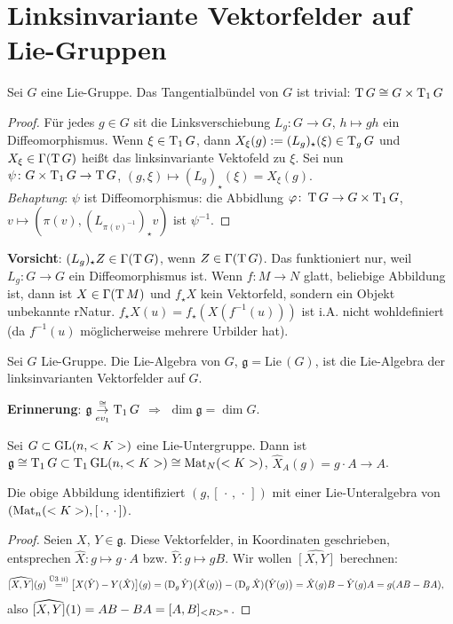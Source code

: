 \section{Linksinvariante Vektorfelder auf Lie-Gruppen}
\begin{lemma}
	Sei $G$ eine Lie-Gruppe. Das Tangentialbündel von $G$ ist trivial: $\operatorname{T} G\cong G\times \operatorname{T}_1 G$
\end{lemma}

\begin{proof}
	Für jedes $g\in G$ sit die Linksverschiebung $L_g\colon G\to G$, $h\mapsto gh$ ein Diffeomorphismus. Wenn $\xi \in \operatorname{T}_1 G$, dann $X_\xi(g) := (L_g)_\star (\xi)\in \operatorname{T}_g G$ und $X_\xi \in\Gamma(\operatorname{T} G)$ heißt das linksinvariante Vektofeld zu $\xi$.
	Sei nun $\psi\colon G\times \operatorname{T}_1 G\to \operatorname{T} G$, $(g,\xi)\mapsto (L_g)_\star(\xi) = X_\xi(g)$.\\
	\emph{Behaptung}: $\psi$ ist Diffeomorphismus: die Abbidlung $\varphi\colon \operatorname{T} G\to G\times \operatorname{T}_1 G$, $v\mapsto (\pi(v),(L_{\pi(v)^{-1}})_\star v)$ ist $\psi^{-1}$.
\end{proof}

\textbf{Vorsicht}: $(L_g)_\star Z\in\Gamma(\operatorname{T} G)$, wenn $Z\in\Gamma(\operatorname{T} G)$. Das funktioniert nur, weil $L_g\colon G\to G$ ein Diffeomorphismus ist. Wenn $f\colon M\to N$ glatt, beliebige Abbildung ist, dann ist $X\in \Gamma(\operatorname{T} M)$ und $f_\star X$ kein Vektorfeld, sondern ein Objekt unbekannte rNatur. $f_\star X(u) = f_{\star}(X(f^{-1}(u)))$ ist i.A. nicht wohldefiniert (da $f^{-1}(u)$ möglicherweise mehrere Urbilder hat).

\begin{definition}
	Sei $G$ Lie-Gruppe. Die Lie-Algebra von $G$, $\mathfrak g = \mathrm{Lie}\,(G)$, ist die Lie-Algebra der linksinvarianten Vektorfelder auf $G$.
\end{definition}

\textbf{Erinnerung}: $\mathfrak g\overset{\cong}{\underset{ev_1}{\rightarrow}} \operatorname{T}_1 G$ $\Rightarrow$ $\dim\mathfrak g=\dim G$.

Sei $G\subset\operatorname{GL}(n,<K>)$ eine Lie-Untergruppe. Dann ist $\mathfrak g\cong \operatorname{T}_1 G\subset \operatorname{T}_1 \operatorname{GL}(n,<K>)\cong \operatorname{Mat}_N(<K>)$, $\hat X_A(g) = g\cdot A\to A$.

\begin{proposition}
	Die obige Abbildung identifiziert $(g,[\,\cdot\,,\,\cdot\,])$ mit einer Lie-Unteralgebra von $(\operatorname{Mat}_n(<K>),[\,\cdot\,,\,\cdot\,])$.
\end{proposition}
\begin{proof}
	Seien $X$, $Y\in\mathfrak g$. Diese Vektorfelder, in Koordinaten geschrieben, entsprechen $\hat X\colon g\mapsto g\cdot A$ bzw. $\hat Y\colon g\mapsto gB$.  Wir wollen $\widehat{[X,Y]}$ berechnen:\begin{align*}
		\widehat{[X,Y]}(g) &\overset{\text{Ü3 ii)}}{=}\big[ X(\hat Y) - Y(\hat X)\big](g) = (\operatorname{D}_g \hat Y)\big(\hat X(g)\big) - (\operatorname{D}_g \hat X)\big(\hat Y(g)\big) = \hat X(g)B - \hat Y(g) A = g(AB - BA),
	\end{align*}
	also $\widehat{[X,Y]}(1) = AB - BA = [A,B]_{<R>^n}$.
\end{proof}

